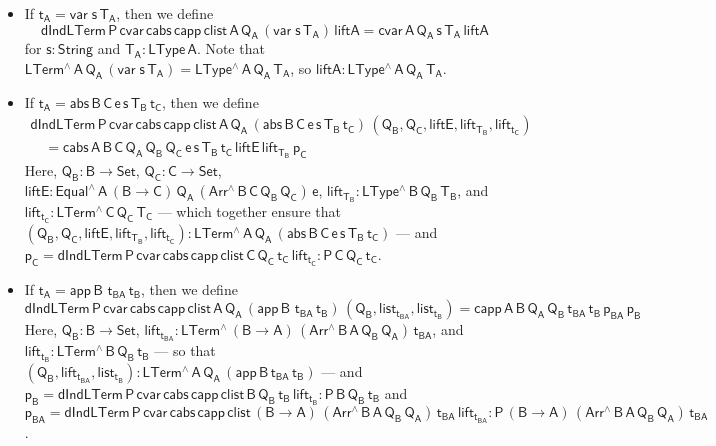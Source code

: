 \documentclass[9pt]{entcs}
\begin{document}
\begin{itemize}
\item If $\mathsf{t_A = var\; s\, T_A}$, then we define
\[ \mathsf{dIndLTerm \, P\, cvar \, cabs\, capp\, clist \, A\, Q_A\,
  (var\;s\,T_A) \, liftA = cvar \, A\, Q_A\, s\, T_A\, liftA }\] for
$\mathsf{s : String}$ and $\mathsf{T_A : LType\,A}$.  Note that
$\mathsf{LTerm^{\wedge}\, A\, Q_A\, (var\;s\,T_A) =
  LType^{\wedge}\,A\,Q_A\,T_A}$, so $\mathsf{liftA :
  LType^{\wedge}\,A\,Q_A\,T_A}$.
\item If $\mathsf{t_A = abs \,B \,C \, e \,s \,T_B \, t_C} $, then we
  define
\[
\begin{array}{l}
\mathsf{dIndLTerm \, P\, cvar \, cabs\, capp\, clist \, A\, Q_A\,
  (abs \,B \,C \,e \,s \,T_B \, t_C) \, (Q_B , Q_C , liftE,
  lift_{T_B}, lift_{t_C})} \\ \quad \mathsf{= cabs\,A\,B\,C\, Q_A\,
  Q_B\, Q_C\, e\, s\, T_B\, t_C\, liftE\, lift_{T_B}\, p_C}
\end{array}
\]
Here, $\mathsf{Q_B : B \to Set}$, $\mathsf{Q_C : C \to Set}$,
$\mathsf{liftE : Equal^{\wedge} \, A\, (B \to C)\, Q_A\, (Arr^{\wedge}
  \, B\, C\, Q_B \, Q_C) \, e}$, $\mathsf{lift_{T_B}: LType^{\wedge}
  \, B\, Q_B\, T_B}$, and $\mathsf{lift_{t_C}: LTerm^{\wedge} \, C\,
  Q_C\, T_C}$ --- which together ensure that $\mathsf{(Q_B , Q_C ,
  liftE, lift_{T_B}, lift_{t_C}) : LTerm^{\wedge}\, A\, Q_A\, (abs \,B
  \,C \, e \,s \,T_B \, t_C)}$ --- and $\mathsf{p_C =
  dIndLTerm\,P\,cvar\,cabs \,capp \,clist\, C\, Q_C\, t_C\,
  lift_{t_C} : P \, C\, Q_C \, t_C }$.
\item If $\mathsf{t_A = app \,B \,\,t_{BA} \, t_B} $, then we define
\[ \mathsf{dIndLTerm \, P\, cvar \, cabs\, capp\, clist \, A\, Q_A\,
    (app \,B \,\,t_{BA} \, t_B)\, (Q_B , list_{t_{BA}}, list_{t_B})}
  \mathsf{ = capp\,A\,B\,Q_A\, Q_B\, t_{BA}\, t_B\, p_{BA} \, p_B}
\]
Here, $\mathsf{Q_B : B \to Set}$, $\mathsf{lift_{t_{BA}}:
  LTerm^{\wedge} \, (B \to A)\, (Arr^{\wedge} \, B\, A\, Q_B \, Q_A)\,
  t_{BA}}$, and $\mathsf{lift_{t_B}: LTerm^{\wedge} \, B\, Q_B\, t_B}$
--- so that\\ $\mathsf{(Q_B , lift_{t_{BA}}, list_{t_B}) : 
  LTerm^{\wedge}\, A\, Q_A\, (app \,B \,t_{BA} \, t_B)}$ --- and
$\mathsf{p_B} = \mathsf{dIndLTerm\,P\,cvar\,cabs \,capp \,clist\, B\,
  Q_B\, t_B\, lift_{t_B} : P \, B\, Q_B \, t_B }$ and $\mathsf{p_{BA}}
= \mathsf{dIndLTerm\,P\,cvar\,cabs \,capp \,clist\, (B \to
  A)\,(Arr^{\wedge} \, B\, A\, Q_B \, Q_A) \, t_{BA}\, lift_{t_{BA}} :
  P \, (B \to A)\, (Arr^{\wedge} \, B\, A\, Q_B \, Q_A) \, t_{BA} }$.

\end{itemize}
\end{document}
